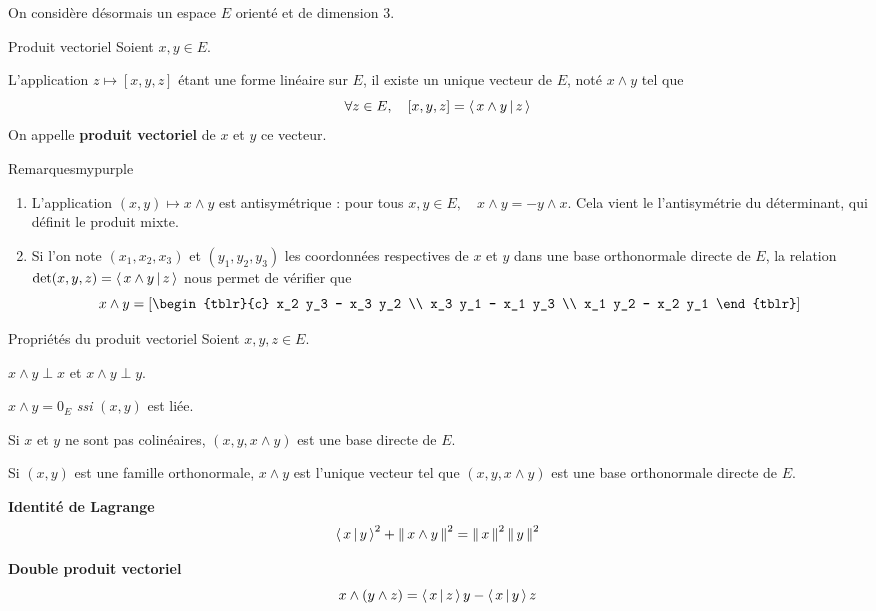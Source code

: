     On considère désormais un espace $E$ orienté et de dimension $3$.

    \begin{defitheo}{Produit vectoriel}{}
        Soient $x,y \in E$. 

        L’application $z \mapsto [x,y,z]$ étant une forme linéaire sur $E$, il existe un unique vecteur de $E$, noté $x \wedge y$ tel que 
        \[ \forall z \in E, \quad [x,y,z] = \left<\,x \wedge y\,\middle|\,z\,\right> \]   
        On appelle \textbf{produit vectoriel} de $x$ et $y$ ce vecteur.
    \end{defitheo}

    \begin{omed}{Remarques}{mypurple}
        \begin{enumerate}[label=\textcolor{mypurple}{\arabic*.}]
            \item L’application $(x,y) \mapsto x \wedge y$ est antisymétrique : pour tous $x,y \in E, \quad x \wedge y = - y \wedge x$. Cela vient le l’antisymétrie du déterminant, qui définit le produit mixte.
            \item Si l’on note $(x_1,x_2,x_3)$ et $(y_1,y_2,y_3)$ les coordonnées respectives de $x$ et $y$ dans une base orthonormale directe de $E$, la relation $\det(x,y,z) = \left<\,x \wedge y\,\middle|\,z\,\right>$ nous permet de vérifier que 
            \[ x \wedge y = \left[\begin{tblr}{c}
                x_2 y_3 - x_3 y_2 \\
                x_3 y_1 - x_1 y_3 \\
                x_1 y_2 - x_2 y_1
            \end{tblr}\right] \]
        \end{enumerate}
    \end{omed}

    \begin{prop}{Propriétés du produit vectoriel}{}
        Soient $x,y,z \in E$.

        \begin{alors}
            \item $x \wedge y \perp x$ et $x \wedge y \perp y$.
            \item $x \wedge y = 0_E$ \textit{ssi} $(x,y)$ est liée.
            \item Si $x$ et $y$ ne sont pas colinéaires, $(x,y, x \wedge y)$ est une base directe de $E$.
            \item Si $(x,y)$ est une famille orthonormale, $x \wedge y$ est l’unique vecteur tel que $(x,y, x \wedge y)$ est une base orthonormale directe de $E$.
            \item \textbf{Identité de Lagrange}
            \[ \left<\,x\,\middle|\,y\,\right>^2 + \left\lVert \,x \wedge y \, \right\rVert^2 = \left\lVert \,x \, \right\rVert^2 \left\lVert \,y \, \right\rVert^2 \]   
            \item \textbf{Double produit vectoriel} 
            \[ x \wedge (y \wedge z) = \left<\,x\,\middle|\,z\,\right> y - \left<\,x\,\middle|\,y\,\right> z \]
        \end{alors}
    \end{prop}

